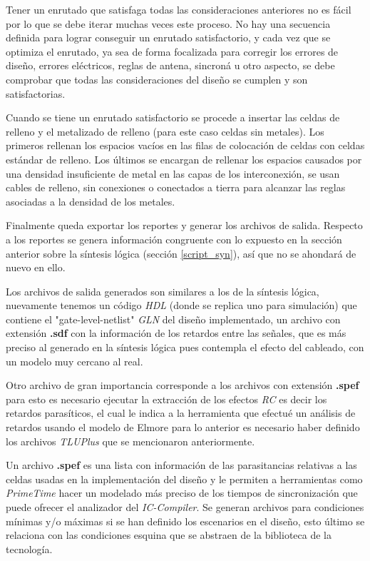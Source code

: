 Tener un enrutado que satisfaga todas las consideraciones anteriores no es fácil por lo que se debe iterar muchas veces este proceso. No hay una secuencia definida para lograr conseguir un enrutado satisfactorio, y cada vez que se optimiza el enrutado, ya sea de forma focalizada para corregir los errores de diseño, errores eléctricos, reglas de antena, sincroná u otro aspecto, se debe comprobar que todas las consideraciones del diseño se cumplen y son satisfactorias.

Cuando se tiene un enrutado satisfactorio se procede a insertar las celdas de relleno y el metalizado de relleno (para este caso celdas sin metales). Los primeros rellenan los espacios vacíos en las filas de colocación de celdas con celdas estándar de relleno. Los últimos se encargan de rellenar los espacios causados por una densidad insuficiente de metal en las capas de los interconexión, se usan cables de relleno, sin conexiones o conectados a tierra para alcanzar las reglas asociadas a la densidad de los metales.

Finalmente queda exportar los reportes y generar los archivos de salida. Respecto a los reportes se genera información congruente con lo expuesto en la sección anterior sobre la síntesis lógica (sección \ref{script_syn}), así que no se ahondará de nuevo en ello.

Los archivos de salida generados son similares a los de la síntesis lógica, nuevamente tenemos un código \textit{HDL} (donde se replica uno para simulación) que contiene el "gate-level-netlist" \textit{GLN} del diseño implementado, un archivo con extensión \textbf{.sdf} con la información de los retardos entre las señales, que es más preciso al generado en la síntesis lógica pues contempla el efecto del cableado, con un modelo muy cercano al real.

Otro archivo de gran importancia corresponde a los archivos con extensión \textbf{.spef} para esto es necesario ejecutar la extracción de los efectos \textit{RC} es decir los retardos parasíticos, el cual le indica a la herramienta que efectué un análisis de retardos usando el modelo de Elmore \cite{book:weste2005} para lo anterior es necesario haber definido los archivos \textit{TLUPlus} que se mencionaron anteriormente.

Un archivo \textbf{.spef} es una lista con información de las parasitancias relativas a las celdas usadas en la implementación del diseño y le permiten a herramientas como \textit{PrimeTime} hacer un modelado más preciso de los tiempos de sincronización que puede ofrecer el analizador del \textit{IC-Compiler}. Se generan archivos para condiciones mínimas y/o máximas si se han definido los escenarios en el diseño, esto último se relaciona con las condiciones esquina que se abstraen de la biblioteca de la tecnología.

